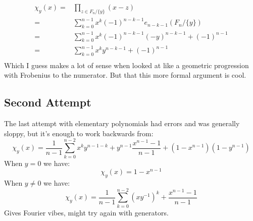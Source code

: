 \begin{equation*}
\begin{aligned}
\chi_y(x) =& \prod_{z\in F_n/\{y\}}(x-z)\\
=&\sum_{k=0}^{n-1}x^k(-1)^{n-k-1}e_{n-k-1}(F_n/\{y\})\\
=&\sum_{k=0}^{n-1}x^k(-1)^{n-k-1}(-y)^{n-k-1}+(-1)^{n-1}\\
=&\sum_{k=0}^{n-1}x^ky^{n-k-1}+(-1)^{n-1}\\
\end{aligned}
\end{equation*}
Which I guess makes a lot of sense when looked at like a geometric progression with
Frobenius to the numerator.
But that this more formal argument is cool.

\subsection{Second Attempt}
The last attempt with elementary polynomials had errors and was generally sloppy,
but it's enough to work backwards from:
\[\chi_y(x) = \frac{1}{n-1}\sum_{k=0}^{n-2}x^ky^{n-1-k}+y^{n-1}\frac{x^{n-1}-1}{n-1}+(1-x^{n-1})(1-y^{n-1})\]
When $y=0$ we have:
\[\chi_y(x) = 1-x^{n-1}\]
When $y\neq 0$ we have:
\[\chi_y(x) = \frac{1}{n-1}\sum_{k=0}^{n-2}(xy^{-1})^k+\frac{x^{n-1}-1}{n-1}\]
Gives Fourier vibes, might try again with generators.
